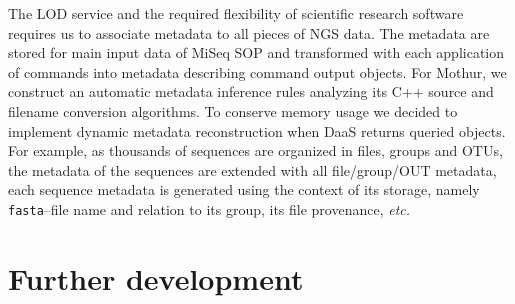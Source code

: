\documentclass[a4paper]{jpconf}
\begin{document}
The LOD service and the required flexibility of scientific research software requires us to associate metadata to all pieces of NGS data.  The metadata are stored for main input data of MiSeq SOP and transformed with each application of commands into metadata describing command output objects.  For Mothur, we construct an automatic metadata inference rules analyzing its C++ source and filename conversion algorithms.  To conserve memory usage we decided to implement dynamic metadata reconstruction when DaaS returns queried objects.  For example, as thousands of sequences are organized in files, groups and OTUs, the metadata of the sequences are extended with all file/group/OUT metadata, each sequence metadata is generated using the context of its storage, namely \verb|fasta|--file name and relation to its group, its file provenance, \emph{etc.}


\section{Further development}
\end{document}
